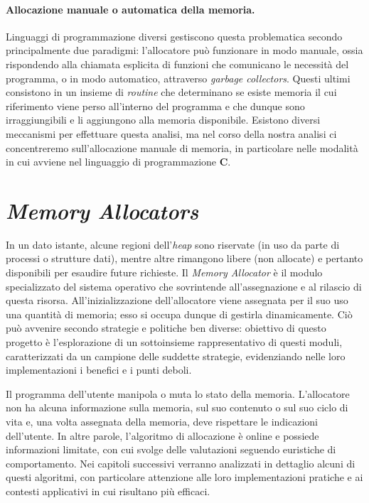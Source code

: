 \paragraph{Allocazione manuale o automatica della memoria.}
Linguaggi di programmazione diversi gestiscono questa problematica secondo principalmente due paradigmi: l'allocatore può funzionare in modo manuale, ossia rispondendo alla chiamata esplicita di funzioni che comunicano le necessità del programma, o in modo automatico, attraverso \textit{garbage collectors}. Questi ultimi consistono in un insieme di \textit{routine} che determinano se esiste memoria il cui riferimento viene perso all'interno del programma e che dunque sono irraggiungibili e li aggiungono alla memoria disponibile. Esistono diversi meccanismi per effettuare questa analisi, ma nel corso della nostra analisi ci concentreremo sull'allocazione manuale di memoria, in particolare nelle modalità in cui avviene nel linguaggio di programmazione \textbf{C}. 

\section{\textit{Memory Allocators}}

In un dato istante, alcune regioni dell'\textit{heap} sono riservate (in uso da parte di processi o strutture dati), mentre altre rimangono libere (non allocate) e pertanto disponibili per esaudire future richieste. Il \textit{Memory Allocator} è il modulo specializzato del sistema operativo che sovrintende all'assegnazione e al rilascio di questa risorsa. All'inizializzazione dell'allocatore viene assegnata per il suo uso una quantità di memoria; esso si occupa dunque di gestirla dinamicamente. Ciò può avvenire secondo strategie e politiche ben diverse: obiettivo di questo progetto è l'esplorazione di un sottoinsieme rappresentativo di questi moduli, caratterizzati da un campione delle suddette strategie, evidenziando nelle loro implementazioni i benefici e i punti deboli.

Il programma dell'utente manipola o muta lo stato della memoria. L'allocatore non ha alcuna informazione sulla memoria, sul suo contenuto o sul suo ciclo di vita e, una volta assegnata della memoria, deve rispettare le indicazioni dell'utente. In altre parole, l'algoritmo di allocazione è online e possiede informazioni limitate, con cui svolge delle valutazioni seguendo euristiche di comportamento. Nei capitoli successivi verranno analizzati in dettaglio alcuni di questi algoritmi, con particolare attenzione alle loro implementazioni pratiche e ai contesti applicativi in cui risultano più efficaci. 

